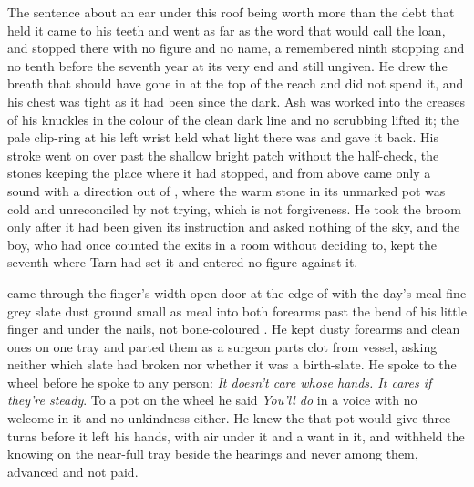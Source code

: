 The sentence about an ear under this roof being worth more than the debt that held it came to his teeth and went as far as the word that would call the loan, and stopped there with no figure and no name, a remembered ninth stopping and no tenth before the seventh year at its very end and still ungiven. He drew the breath that should have gone in at the top of the reach and did not spend it, and his chest was tight as it had been since the dark. Ash was worked into the creases of his knuckles in the colour of the clean dark line and no scrubbing lifted it; the pale clip-ring at his left wrist held what light there was and gave it back. His stroke went on over  past the shallow bright patch without the half-check, the stones keeping the place where it had stopped, and from above came only a sound with a direction out of , where the warm stone in its unmarked pot was cold and unreconciled by not trying, which is not forgiveness. He took the broom only after it had been given its instruction and asked nothing of the sky, and the boy, who had once counted the exits in a room without deciding to, kept the seventh where Tarn had set it and entered no figure against it.

\scenebreak

 came through the finger's-width-open door at the edge of  with the day's meal-fine grey slate dust ground small as meal into both forearms past the bend of his little finger and under the nails, not bone-coloured . He kept dusty forearms and clean ones on one tray and parted them as a surgeon parts clot from vessel, asking neither which slate had broken nor whether it was a birth-slate. He spoke to the wheel before he spoke to any person: \emph{It doesn't care whose hands. It cares if they're steady}. To a pot on the wheel he said \emph{You'll do} in a voice with no welcome in it and no unkindness either. He knew the  that pot would give three turns before it left his hands, with air under it and a want in it, and withheld the knowing on the near-full tray beside the hearings and never among them, advanced and not paid.

